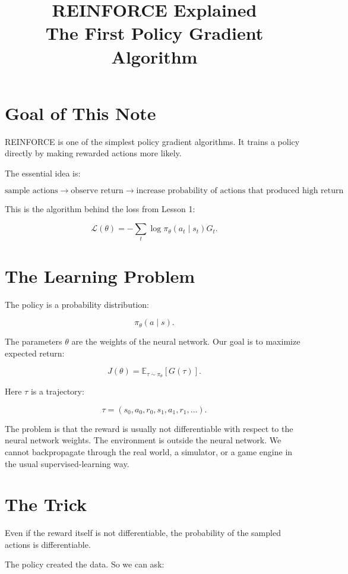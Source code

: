 \documentclass[11pt]{article}
\title{REINFORCE Explained\\
\large The First Policy Gradient Algorithm}
\author{}
\date{}
\begin{document}
\maketitle

\section{Goal of This Note}

REINFORCE is one of the simplest policy gradient algorithms.
It trains a policy directly by making rewarded actions more likely.

The essential idea is:

\[
\boxed{
\text{sample actions} \rightarrow \text{observe return} \rightarrow
\text{increase probability of actions that produced high return}
}
\]

This is the algorithm behind the loss from Lesson 1:

\[
\mathcal{L}(\theta)
=
-\sum_t \log \pi_\theta(a_t \mid s_t)G_t.
\]

\section{The Learning Problem}

The policy is a probability distribution:

\[
\pi_\theta(a \mid s).
\]

The parameters $\theta$ are the weights of the neural network.
Our goal is to maximize expected return:

\[
J(\theta)
=
\mathbb{E}_{\tau \sim \pi_\theta}[G(\tau)].
\]

Here $\tau$ is a trajectory:

\[
\tau = (s_0, a_0, r_0, s_1, a_1, r_1, \ldots).
\]

The problem is that the reward is usually not differentiable with respect to the neural network weights.
The environment is outside the neural network.
We cannot backpropagate through the real world, a simulator, or a game engine in the usual supervised-learning way.

\section{The Trick}

Even if the reward itself is not differentiable, the probability of the sampled actions is differentiable.

The policy created the data.
So we can ask:
\end{document}
